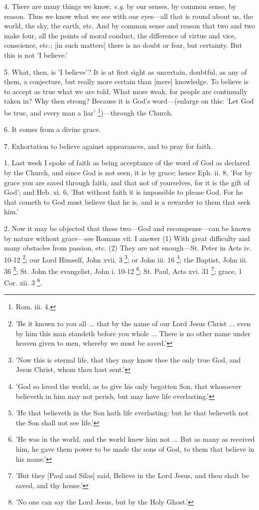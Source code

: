 4. There are many things we know, \emph{e.g}. by
our senses, by common sense, by reason. Thus we know what we see with
our eyes—all that is round about us, the world, the sky, the earth,
etc. And by common sense and reason that two and two make four, all
the points of moral conduct, the difference of virtue and vice,
conscience, etc.; [in such matters] there is no doubt or fear, but
certainty. But this is not 'I believe.'

5. What, then, is 'I believe'? It is at first
sight as uncertain, doubtful, as any of them, a conjecture, but
really more certain than [mere] knowledge. To believe is to accept as
true what we are told. What more weak, for people are continually
taken in? Why then strong? Because it is God's word—(enlarge on
this: 'Let God be true, and every man a liar' \footnote{Rom. iii. 4.})—through the Church.

6. It comes from a divine grace.

7. Exhortation to believe against appearances,
and to pray for faith.


1. Last week I spoke of faith as being acceptance
of the word of God as declared by the Church, and since God is not
seen, it is by grace; hence Eph. ii. 8, 'For by grace you are saved
through faith, and that not of yourselves, for it is the gift of God';
and Heb. xi. 6, 'But without faith it is impossible to please God. For
he that cometh to God must believe that he is, and is a rewarder to
them that seek him.'

2. Now it may be objected that these two—God
and recompense—can be known by nature without grace—see Romans
vii. I answer (1) With great difficulty and many obstacles from
passion, etc. (2) They are not enough—St. Peter in Acts iv. 10-12 \footnote{'Be it known to you all
... that by the name of our Lord Jesus Christ ... even by him this man
standeth before you whole ... There is no other name under heaven
given to men, whereby we must be saved.'}; our Lord Himself, John xvii. 3 \footnote{'Now this is eternal
life, that they may know thee the only true God, and Jesus Christ,
whom thou hast sent.'}; or John iii. 16 \footnote{'God so loved the world,
as to give his only begotten Son, that whosoever believeth in him may
not perish, but may have life everlasting.'};
the Baptist, John iii. 36 \footnote{'He that believeth in
the Son hath life everlasting: but he that believeth not the Son shall
not see life.'};
St. John the evangelist, John i. 10-12 \footnote{'He was in the world,
and the world knew him not ... But as many as received him, he gave
them power to be made the sons of God, to them that believe in his
name.'}; St. Paul, Acts xvi. 31 \footnote{'But they [Paul and
Silas] said, Believe in the Lord Jesus, and thou shalt be saved, and
thy house.'}; grace, 1 Cor. xii. 3 \footnote{'No one can say the Lord
Jesus, but by the Holy Ghost.'}.

